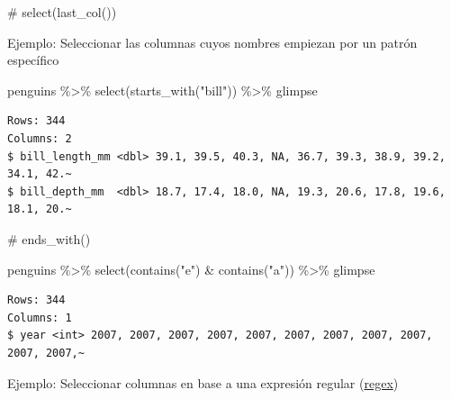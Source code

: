 \documentclass[
  letterpaper,
  DIV=11,
  numbers=noendperiod]{scrreprt}
\newenvironment{Shaded}{\begin{snugshade}}{\end{snugshade}}
\newcommand{\CommentTok}[1]{\textcolor[rgb]{0.37,0.37,0.37}{#1}}
\newcommand{\FunctionTok}[1]{\textcolor[rgb]{0.28,0.35,0.67}{#1}}
\newcommand{\NormalTok}[1]{\textcolor[rgb]{0.00,0.23,0.31}{#1}}
\newcommand{\SpecialCharTok}[1]{\textcolor[rgb]{0.37,0.37,0.37}{#1}}
\newcommand{\StringTok}[1]{\textcolor[rgb]{0.13,0.47,0.30}{#1}}
\begin{document}
\begin{Shaded}
\begin{Highlighting}[]
\CommentTok{\# select(last\_col())}
\end{Highlighting}
\end{Shaded}

{Ejemplo}: Seleccionar las columnas cuyos nombres empiezan por un patrón
específico

\begin{Shaded}
\begin{Highlighting}[]
\NormalTok{penguins }\SpecialCharTok{\%\textgreater{}\%} 
  \FunctionTok{select}\NormalTok{(}\FunctionTok{starts\_with}\NormalTok{(}\StringTok{"bill"}\NormalTok{)) }\SpecialCharTok{\%\textgreater{}\%} 
\NormalTok{  glimpse}
\end{Highlighting}
\end{Shaded}

\begin{verbatim}
Rows: 344
Columns: 2
$ bill_length_mm <dbl> 39.1, 39.5, 40.3, NA, 36.7, 39.3, 38.9, 39.2, 34.1, 42.~
$ bill_depth_mm  <dbl> 18.7, 17.4, 18.0, NA, 19.3, 20.6, 17.8, 19.6, 18.1, 20.~
\end{verbatim}

\begin{Shaded}
\begin{Highlighting}[]
\CommentTok{\# ends\_with()}
\end{Highlighting}
\end{Shaded}

\begin{Shaded}
\begin{Highlighting}[]
\NormalTok{penguins }\SpecialCharTok{\%\textgreater{}\%} 
  \FunctionTok{select}\NormalTok{(}\FunctionTok{contains}\NormalTok{(}\StringTok{"e"}\NormalTok{) }\SpecialCharTok{\&} \FunctionTok{contains}\NormalTok{(}\StringTok{"a"}\NormalTok{)) }\SpecialCharTok{\%\textgreater{}\%} 
\NormalTok{  glimpse}
\end{Highlighting}
\end{Shaded}

\begin{verbatim}
Rows: 344
Columns: 1
$ year <int> 2007, 2007, 2007, 2007, 2007, 2007, 2007, 2007, 2007, 2007, 2007,~
\end{verbatim}

{Ejemplo}: Seleccionar columnas en base a una expresión regular
(\href{https://www.rexegg.com/regex-quickstart.html}{regex})

\begin{Shaded}
\end{Shaded}
\end{document}
